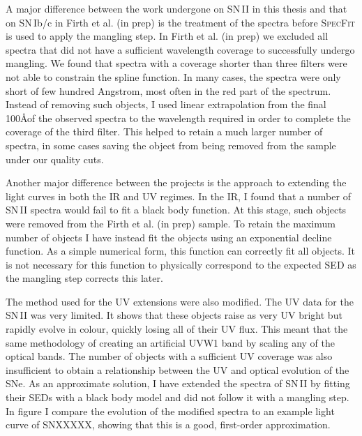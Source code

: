 A major difference between the work undergone on SN\,II in this thesis and that on SN\,Ib/c in Firth et al. (in prep) is the treatment of the spectra before \textsc{SpecFit} is used to apply the mangling step. In Firth et al. (in prep) we excluded all spectra that did not have a sufficient wavelength coverage to successfully undergo mangling. We found that spectra with a coverage shorter than three filters were not able to constrain the spline function. In many cases, the spectra were only short of few hundred Angstrom, most often in the red part of the spectrum. Instead of removing such objects, I used linear extrapolation from the final 100\AA of the observed spectra to the wavelength required in order to complete the coverage of the third filter. This helped to retain a much larger number of spectra, in some cases saving the object from being removed from the sample under our quality cuts.

Another major difference between the projects is the approach to extending the light curves in both the IR and UV regimes. In the IR, I found that a number of SN\,II spectra would fail to fit a black body function. At this stage, such objects were removed from the Firth et al. (in prep) sample. To retain the maximum number of objects I have instead fit the objects using an exponential decline function. As a simple numerical form, this function can correctly fit all objects. It is not necessary for this function to physically correspond to the expected SED as the mangling step corrects this later.

The method used for the UV extensions were also modified. The UV data for the SN\,II was very limited. It shows that these objects raise as very UV bright but rapidly evolve in colour, quickly losing all of their UV flux. This meant that the same methodology of creating an artificial UVW1 band by scaling any of the optical bands. The number of objects with a sufficient UV coverage was also insufficient to obtain a relationship between the UV and optical evolution of the SNe. As an approximate solution, I have extended the spectra of SN\,II by fitting their SEDs with a black body model and did not follow it with a mangling step. In figure  I compare the evolution of the modified spectra to an example light curve of SNXXXXX, showing that this is a good, first-order approximation.

